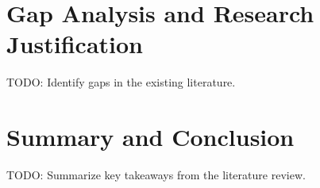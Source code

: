 \section{Gap Analysis and Research Justification}
TODO: Identify gaps in the existing literature.

\section{Summary and Conclusion}
TODO: Summarize key takeaways from the literature review.

